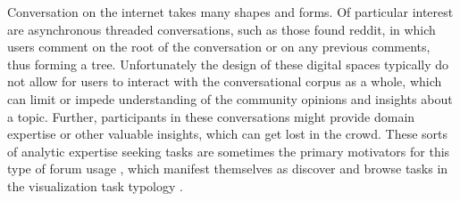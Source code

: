 \documentclass{egpubl}
\begin{document}
Conversation on the internet takes many shapes and forms. 
%
Of particular interest are asynchronous threaded conversations, such as those found reddit, in which users comment on the root of the conversation or on any previous comments, thus forming a tree. 
%
Unfortunately the design of these digital spaces typically do not allow for users to interact with the conversational corpus as a whole, which can limit or impede understanding of the community opinions and insights about a topic.
%
Further, participants in these conversations might provide domain expertise or other valuable insights, which can get lost in the crowd.
%
These sorts of analytic expertise seeking tasks are sometimes the primary motivators for this type of forum usage \cite{barik2015heart, hoque2014convis}, which manifest themselves as discover and browse tasks in the visualization task typology \cite{brehmer2013multi}.
\end{document}
